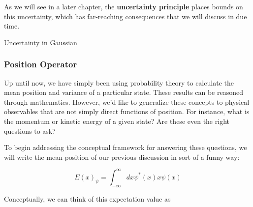 As we will see in a later chapter, the \textbf{uncertainty principle} places bounds on this uncertainty, which has far-reaching consequences that we will discuss in due time. 

\begin{example}
	Uncertainty in Gaussian
\end{example}
\subsubsection{Position Operator}

Up until now, we have simply been using probability theory to calculate the mean position and variance of a particular state. These results can be reasoned through mathematics. However, we'd like to generalize these concepts to physical observables that are not simply direct functions of position. For instance, what is the momentum or kinetic energy of a given state? Are these even the right questions to ask? 

To begin addressing the conceptual framework for answering these questions, we will write the mean position of our previous discussion in sort of a funny way:

\begin{equation}
	E(x)_{\psi} = \int_{-\infty}^{\infty}dx \psi^*(x) x \psi(x)
\end{equation}

Conceptually, we can think of this expectation value as 
%
%
%
%
%	
